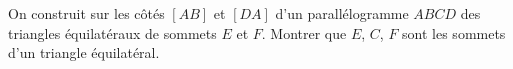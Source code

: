 On construit sur les côtés $[AB]$ et $[DA]$ d'un parallélogramme $ABCD$ des triangles équilatéraux de sommets $E$ et $F$. Montrer que $E$, $C$, $F$ sont les sommets d'un triangle équilatéral.
